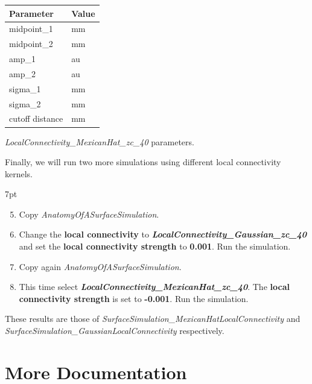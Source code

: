 \documentclass{tufte-handout}
\newenvironment{simulation}{%
  \def\FrameCommand{%
    \hspace{1pt}%
    {\color{ForestGreen}\vrule width 2pt}%
    {\color{simulationshade}\vrule width 4pt}%
    \colorbox{simulationshade}%
  }%
  \MakeFramed{\advance\hsize-\width\FrameRestore}%
  \noindent\hspace{-4.55pt}%
  \begin{adjustwidth}{}{7pt}%
  \vspace{2pt}\vspace{2pt}%
}
{%
  \vspace{2pt}\end{adjustwidth}\endMakeFramed%
}
\begin{document}
\begin{margintable}
  \centering
  \selectfont
  \begin{tabular}{ll}
    \toprule
    Parameter & Value \\
    \midrule
             midpoint\_1          &   \unit[0]{mm}\\
             midpoint\_2          &   \unit[0]{mm}   \\
             amp\_1                 &   \unit[2]{au}        \\
             amp\_2                 &   \unit[1]{au}        \\
             sigma\_1          &   \unit[5]{mm}   \\
             sigma\_2          &   \unit[15]{mm}   \\
             cutoff distance & \unit[40]{mm}\\
    \bottomrule
  \end{tabular}
  \caption{\textit{LocalConnectivity\_MexicanHat\_zc\_40} parameters. }
  \label{tab:mexicanstab}
\end{margintable}

Finally, we will run two  more simulations using different local connectivity kernels. 

\begin{simulation}
\begin{enumerate}[resume]
\setcounter{enumi}{4}
\item Copy \textit{AnatomyOfASurfaceSimulation}.
\item Change the \textbf{local connectivity} to \textbf{\textit{LocalConnectivity\_Gaussian\_zc\_40}} and set the \textbf{local connectivity strength} to \textbf{0.001}. Run the simulation.
\item Copy again \textit{AnatomyOfASurfaceSimulation}. 
\item This time select \textbf{\textit{LocalConnectivity\_MexicanHat\_zc\_40}}. The \textbf{local connectivity strength} is set to \textbf{-0.001}. Run the simulation. 
\end{enumerate}
\end{simulation}

These results are those of \textit{SurfaceSimulation\_MexicanHatLocalConnectivity} and \textit{SurfaceSimulation\_GaussianLocalConnectivity} respectively.
 

\section{More Documentation}\label{sec:more-doc}
\end{document}
